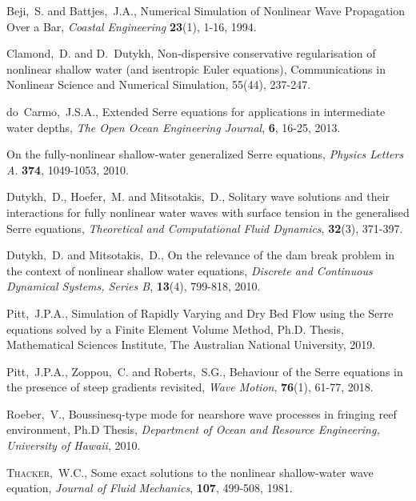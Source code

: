 \documentclass[subeqn]{article}
\begin{document}
\begin{thebibliography}{99}

 Beji,~S. and Battjes,~J.A., Numerical Simulation of Nonlinear Wave Propagation Over a Bar,
\emph{Coastal Engineering} \textbf{23}(1), 1-16, 1994.

 Clamond,~D. and D.~Dutykh, Non-dispersive conservative regularisation of nonlinear shallow water (and isentropic Euler equations), Communications in Nonlinear Science and Numerical Simulation, 55(44), 237-247.

 do~Carmo,~J.S.A., Extended Serre equations for applications in intermediate water depths, \emph{The Open Ocean Engineering Journal}, \textbf{6}, 16-25, 2013.

 On the fully-nonlinear shallow-water generalized Serre equations, \emph{Physics Letters A}. \textbf{374}, 1049-1053, 2010.

 Dutykh,~D., Hoefer,~M. and Mitsotakis,~D., Solitary wave solutions and their interactions for fully nonlinear water waves with surface tension in the generalised Serre equations, \emph{Theoretical and Computational Fluid Dynamics}, \textbf{32}(3), 371-397.

 Dutykh,~D. and Mitsotakis,~D., On the relevance of the dam break problem in the context of nonlinear shallow water equations, \emph{Discrete and Continuous Dynamical Systems, Series B}, \textbf{13}(4), 799-818, 2010.

 Pitt,~J.P.A., Simulation of Rapidly Varying and Dry Bed Flow using the Serre equations solved by a Finite Element Volume Method, Ph.D. Thesis, Mathematical Sciences Institute, The Australian National University, 2019.

 Pitt,~J.P.A., Zoppou,~C. and Roberts,~S.G., Behaviour of the Serre equations in the presence of steep gradients revisited, \emph{Wave Motion}, \textbf{76}(1), 61-77, 2018.

 Roeber,~V., Boussinesq-type mode for nearshore wave processes in fringing reef environment, Ph.D Thesis,  \emph{Department of Ocean and Resource Engineering, University of Hawaii}, 2010.

   \textsc{Thacker,~W.C.}, Some exact solutions to the nonlinear shallow-water wave equation, \emph{Journal of Fluid Mechanics}, \textbf{107}, 499-508, 1981.


\end{thebibliography}
\end{document}
